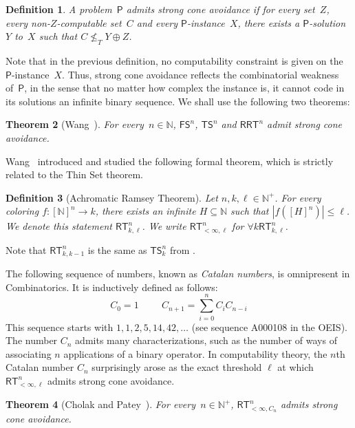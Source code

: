 \documentclass{article}
\newcommand{\Psf}{\mathsf{P}}
\newcommand{\RRT}[0]{\mathsf{RRT}}
\newcommand{\FS}[0]{\mathsf{FS}}
\newcommand{\TS}[0]{\mathsf{TS}}
\newcommand{\RT}[0]{\mathsf{RT}}
\newcommand{\NN}[0]{\mathbb{N}}
\newtheorem{theorem}{Theorem}
\numberwithin{theorem}{section}
\newtheorem{definition}[theorem]{Definition}
\begin{document}
\begin{definition}
A problem~$\Psf$ admits \emph{strong cone avoidance} if for every set~$Z$, every non-$Z$-computable set~$C$ and every $\Psf$-instance~$X$, there exists a $\Psf$-solution~$Y$ to~$X$ such that $C \not \leq_T Y \oplus Z$.
\end{definition}

Note that in the previous definition, no computability constraint is given on the $\Psf$-instance~$X$. Thus, strong cone avoidance reflects the combinatorial weakness of~$\Psf$, in the sense that no matter how complex the instance is, it cannot code in its solutions an infinite binary sequence. We shall use the following two theorems:

\begin{theorem}[Wang~\cite{wang2014some}]
For every~$n \in \NN$, $\FS^n$, $\TS^n$ and $\RRT^n$ admit strong cone avoidance.
\end{theorem}

Wang~\cite{wang2014some} introduced and studied the following formal theorem, which is strictly related to the Thin Set theorem. 

\begin{definition}[Achromatic Ramsey Theorem]
Let $n, k, \ell \in \NN^+$. For every coloring $f : [\NN]^n \to k$, there exists an infinite $H \subseteq \NN$
such that $|f([H]^n)| \leq \ell$. We denote this statement $\RT^n_{k, \ell}$. We write $\RT^n_{<\infty, \ell}$ for $\forall k \RT^n_{k, \ell}$.
\end{definition}

Note that $\RT^n_{k,k-1}$ is the same as $\TS^n_k$ from .

The following sequence of numbers, known as \emph{Catalan numbers}, is omnipresent in Combinatorics. It is inductively defined as follows:
$$
C_0 = 1 \hspace{1cm} C_{n+1} = \sum_{i = 0}^n C_i C_{n-i}
$$
This sequence starts with $1, 1, 2, 5, 14, 42, \dots$ (see sequence A000108 in the OEIS). The number $C_n$ admits many characterizations, such as the number of ways of associating $n$ applications of a binary operator. In computability theory, the $n$th Catalan number $C_n$ surprisingly arose as the exact threshold $\ell$ at which $\RT^n_{<\infty, \ell}$ admits strong cone avoidance.

\begin{theorem}[Cholak and Patey~\cite{cholak2020thin}]
For every~$n \in \NN^+$, $\RT^n_{<\infty, C_n}$ admits strong cone avoidance.
\end{theorem}
\end{document}
